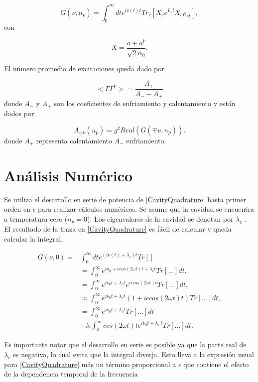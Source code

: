 \documentclass[10pt,a4paper]{report}
\begin{document}
\begin{equation} \label{CavityQuadrature}
G(\nu,n_p) = \int_0^\infty dt e^{i\nu(t) t}Tr_c[X_c e^{L_c t} X_c \rho_{st}],
\end{equation} con 


\begin{equation}
X = \frac{a + a^\dagger}{\sqrt{2}\alpha_0}.
\end{equation}

El número promedio de excitaciones queda dado por

\begin{equation}
<\Gamma \Gamma^\dagger> = \frac{A_+}{A_- - A_+}
\end{equation} donde $A_-$ y $A_+$ son los coeficientes de enfriamiento y calentamiento y están dados por


\begin{equation}
A_{\pm \nu}(n_p) = g^2Real(G(\mp \nu,n_p)).
\end{equation} donde $A_+$ representa calentamiento $A_-$ enfriamiento.


\section{Análisis Numérico}

Se utiliza el desarrollo en serie de potencia de
\eqref{CavityQuadrature} hasta primer orden en $\epsilon$ para
realizar cálculos numéricos. Se asume que la cavidad se encuentra a
temperatura cero ($n_p=0$). Los eigenvalores de la cavidad se denotan
por $\lambda_c$ . El resultado de la traza en \eqref{CavityQuadrature} es fácil de calcular y queda calcular la integral.

\begin{align}
G(\nu,0)=&\int_0^\infty dt e^{(i\nu(t)+\lambda_c) t}Tr[]\\
&= \int_0^\infty e^{i \nu_0 + \epsilon cos(2\omega t) t + \lambda_c t} Tr[...]dt, \\
&=\int_0^\infty e^{i \nu_0 t + \lambda_c t}e^{i \epsilon cos(2\omega t)t} Tr[...]dt, \\
&\approx \int_0^\infty e^{i \nu_0 t + \lambda_c t}(1+i \epsilon cos(2\omega t)t) Tr[...]dt, \\
&=\int_0^\infty e^{i \nu_0 t + \lambda_c t}Tr[...]dt\\
&+i\epsilon\int_0^\infty cos(2\omega t)t e^{i \nu_0 t + \lambda_C t}Tr[...]dt.
\end{align}


Es importante notar que el desarrollo en serie es posible ya que la parte real de $\lambda_c$ es negativa, lo cual evita que la integral diverja. Esto lleva a la expresión usual para \ref{CavityQuadrature} más un término proporcional a $\epsilon$ que contiene el efecto de la dependencia temporal de la frecuencia
\end{document}
